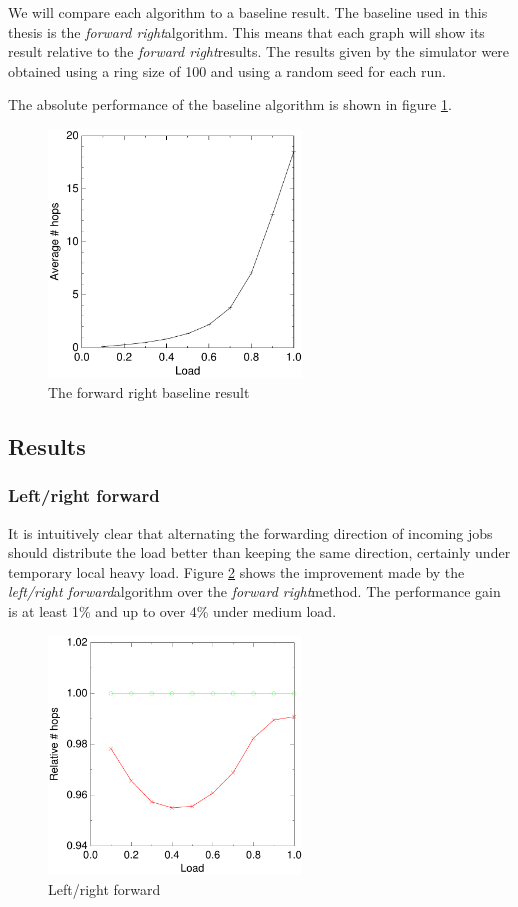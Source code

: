 \documentclass[10pt,a4paper]{article}
\newcommand{\FR}{\textit{forward right\xspace}}
\newcommand{\LRF}{\textit{left/right forward\xspace}}
\begin{document}
We will compare each algorithm to a baseline result. The baseline used in this thesis is the \FR algorithm. This means that each graph will show its result relative to the \FR results. The results given by the simulator were obtained using a ring size of 100 and using a random seed for each run.

The absolute performance of the baseline algorithm is shown in figure \ref{baseline}.

\begin{figure}[h!tb]
\centering
\includegraphics[width=0.6\textwidth]{data/right.pdf}
\caption{The forward right baseline result}
\label{baseline}
\end{figure}

\subsection{Results}
\label{simresults}

\subsubsection*{Left/right forward}
It is intuitively clear that alternating the forwarding direction of incoming jobs should distribute the load better than keeping the same direction, certainly under temporary local heavy load. Figure \ref{figlr} shows the improvement made by the \LRF algorithm over the \FR method. The performance gain is at least 1\% and up to over 4\% under medium load.

\begin{figure}[h!tb]
\centering
\includegraphics[width=0.6\textwidth]{data/switchright.pdf}
\caption{Left/right forward}
\label{figlr}
\end{figure}
\end{document}
